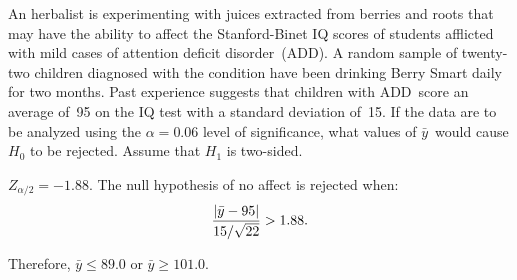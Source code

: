 \begin{problem}
  An herbalist is experimenting with juices extracted from berries and roots that may have the ability to affect the Stanford-Binet IQ scores of students afflicted with mild cases of attention deficit disorder~(ADD).  A random sample of twenty-two children diagnosed with the condition have been drinking Berry Smart daily for two months. Past experience suggests that children with ADD~score an average of~95 on the IQ test with a standard deviation of~15. If the data are to be analyzed using the ${\alpha =0.06}$ level of significance, what values of ${\bar{y}}$~would cause ${H_0}$ to be rejected.  Assume that $H_1$ is two-sided.
\end{problem}

\noindent
${Z_{\alpha / 2} = -1.88}$. The null hypothesis of no affect is rejected when:
\begin{equation*}
  \frac{\lvert\bar{y} - 95\rvert}{15 / \sqrt{22}} > 1.88\text{.}
\end{equation*}

Therefore, ${\bar{y} \leq 89.0}$ or ${\bar{y} \geq 101.0}$.
